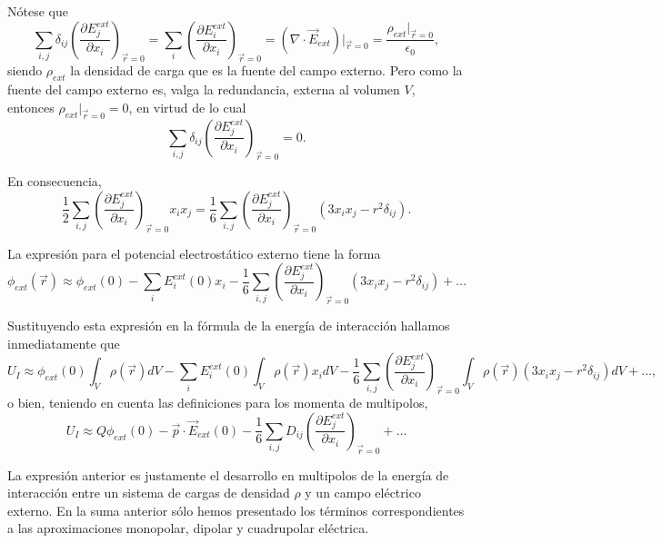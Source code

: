 \documentclass[12pt,a4paper]{book}
\begin{document}
Nótese que
\begin{equation}
\sum_{i,j} \delta_{ij} \left(\frac{\partial E^{ext}_j}{\partial x_i}\right)_{\vec{r}=0} = \sum_i \left(\frac{\partial E^{ext}_i}{\partial x_i}\right)_{\vec{r}=0} = (\nabla \cdot \vec{E}_{ext})|_{\vec{r}=0} = \frac{\rho_{ext}|_{\vec{r}=0}}{\epsilon_0},
\end{equation}
siendo $\rho_{ext}$ la densidad de carga que es la fuente del campo externo. Pero como la fuente del campo externo es, valga la redundancia, externa al volumen $V$, entonces $\rho_{ext}|_{\vec{r}=0} = 0$, en virtud de lo cual
\begin{equation}
\sum_{i,j} \delta_{ij} \left(\frac{\partial E^{ext}_j}{\partial x_i}\right)_{\vec{r}=0} = 0.
\end{equation}

En consecuencia,
\begin{equation}
\frac{1}{2}\sum_{i,j} \left(\frac{\partial E^{ext}_j}{\partial x_i}\right)_{\vec{r}=0} x_i x_j = \frac{1}{6}\sum_{i,j} \left(\frac{\partial E^{ext}_j}{\partial x_i}\right)_{\vec{r}=0} (3x_i x_j - r^2\delta_{ij}).
\end{equation}

La expresión para el potencial electrostático externo tiene la forma
\begin{equation}
\phi_{ext}(\vec{r}) \approx \phi_{ext}(0) - \sum_i E^{ext}_i(0)x_i - \frac{1}{6}\sum_{i,j} \left(\frac{\partial E^{ext}_j}{\partial x_i}\right)_{\vec{r}=0} (3x_i x_j - r^2\delta_{ij}) + \ldots
\end{equation}

Sustituyendo esta expresión en la fórmula de la energía de interacción hallamos inmediatamente que
\begin{equation}
U_I \approx \phi_{ext}(0) \int_V \rho(\vec{r})dV - \sum_i E^{ext}_i(0) \int_V \rho(\vec{r})x_i dV - \frac{1}{6}\sum_{i,j} \left(\frac{\partial E^{ext}_j}{\partial x_i}\right)_{\vec{r}=0} \int_V \rho(\vec{r})(3x_i x_j - r^2\delta_{ij})dV + \ldots,
\end{equation}
o bien, teniendo en cuenta las definiciones para los momenta de multipolos,
\begin{equation}
U_I \approx Q\phi_{ext}(0) - \vec{p} \cdot \vec{E}_{ext}(0) - \frac{1}{6}\sum_{i,j} D_{ij} \left(\frac{\partial E^{ext}_j}{\partial x_i}\right)_{\vec{r}=0} + \ldots
\end{equation}

La expresión anterior es justamente el desarrollo en multipolos de la energía de interacción entre un sistema de cargas de densidad $\rho$ y un campo eléctrico externo. En la suma anterior sólo hemos presentado los términos correspondientes a las aproximaciones monopolar, dipolar y cuadrupolar eléctrica.
\end{document}
